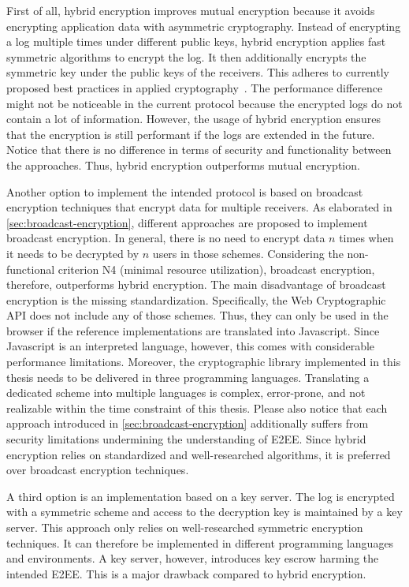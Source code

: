\documentclass[../main.tex]{subfiles}
\begin{document}
First of all, hybrid encryption improves mutual encryption because it avoids encrypting application data with asymmetric cryptography.
Instead of encrypting a log multiple times under different public keys, hybrid encryption applies fast symmetric algorithms to encrypt the log.
It then additionally encrypts the symmetric key under the public keys of the receivers.
This adheres to currently proposed best practices in applied cryptography~\cite[340]{Eckert2018}.
The performance difference might not be noticeable in the current protocol because the encrypted logs do not contain a lot of information.
However, the usage of hybrid encryption ensures that the encryption is still performant if the logs are extended in the future.
Notice that there is no difference in terms of security and functionality between the approaches.
Thus, hybrid encryption outperforms mutual encryption.

Another option to implement the intended protocol is based on broadcast encryption techniques that encrypt data for multiple receivers.
As elaborated in \cref{sec:broadcast-encryption}, different approaches are proposed to implement broadcast encryption.
In general, there is no need to encrypt data $n$ times when it needs to be decrypted by $n$ users in those schemes.
Considering the non-functional criterion N4 (minimal resource utilization), broadcast encryption, therefore, outperforms hybrid encryption.
The main disadvantage of broadcast encryption is the missing standardization.
Specifically, the Web Cryptographic API does not include any of those schemes.
Thus, they can only be used in the browser if the reference implementations are translated into Javascript.
Since Javascript is an interpreted language, however, this comes with considerable performance limitations.
Moreover, the cryptographic library implemented in this thesis needs to be delivered in three programming languages.
Translating a dedicated scheme into multiple languages is complex, error-prone, and not realizable within the time constraint of this thesis.
Please also notice that each approach introduced in \cref{sec:broadcast-encryption} additionally suffers from security limitations undermining the understanding of E2EE.
Since hybrid encryption relies on standardized and well-researched algorithms, it is preferred over broadcast encryption techniques.

A third option is an implementation based on a key server.
The log is encrypted with a symmetric scheme and access to the decryption key is maintained by a key server.
This approach only relies on well-researched symmetric encryption techniques.
It can therefore be implemented in different programming languages and environments.
A key server, however, introduces key escrow harming the intended E2EE.
This is a major drawback compared to hybrid encryption.
\end{document}
